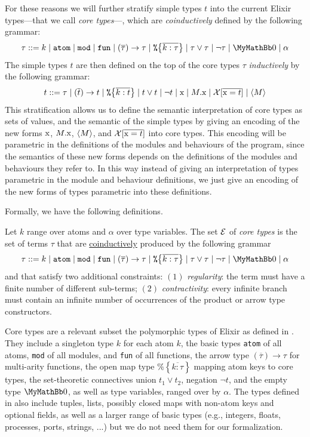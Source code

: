 \documentclass[a4paper,10pt]{article}
\begin{document}
For these reasons we will further stratify simple types $t$ into the current Elixir types---that we call \emph{core types}---, which are \emph{coinductively} defined by the following grammar:
$$\tau ::= k\mid\texttt{atom} \mid \texttt{mod} \mid \texttt{fun} \mid (\overline{\tau})\to\tau \mid \texttt{\%}\!\left\{\overline{k:\tau}\right\} \mid
    \tau \lor \tau \mid \lnot \tau \mid \Empty\mid \alpha
  $$
The simple types $t$ are then defined on the top of the core types $\tau$ \emph{inductively} by the following grammar:
$$t ::= \tau \mid  (\overline{t})\to t \mid \texttt{\%}\!\left\{\overline{k:t}\right\} \mid
    t \lor t \mid \lnot t \mid \text{\rm x}\mid M.\text{\rm x} \mid \mathcal{X}[\overline{\text{\rm x}=t}] \mid \langle M\rangle
  $$
This stratification allows us to define the semantic interpretation of core types as sets of values, and the semantic of the simple types by giving an encoding of the new forms $\text{\rm x}$, $M.\text{\rm x}$, $\langle M\rangle$, and $\mathcal{X}[\overline{\text{\rm x}=t}]$ into core types. This encoding will be parametric in the definitions of the modules and behaviours of the program, since the semantics of these new forms depends on the definitions of the modules and behaviours they refer to. In this way instead of giving an interpretation of types parametric in the module and behaviour definitions, we just give an encoding of the new forms of types parametric into these definitions.

Formally, we have the following definitions.

\begin{definition}\label{def:coretypes}
  Let $k$ range over atoms and $\alpha$ over type variables.
  The set $ \mathcal{E} $ of \emph{core types} is the set of terms $ \tau $
  that are \underline{coinductively} produced by the following grammar
  \[
    \tau ::= k\mid \texttt{atom} \mid \texttt{mod} \mid \texttt{fun} \mid (\overline{\tau}) \to \tau \mid  \texttt{\%}\!\left\{\overline{k:\tau}\right\} \mid
    \tau \lor \tau \mid \lnot \tau \mid \Empty\mid \alpha
  \]
  and that satisfy two additional constraints: $(1)$ \emph{regularity}:
          the term must have a finite number of different sub-terms; $(2)$ \emph{contractivity}:
          every infinite branch must contain an infinite number
          of occurrences of the product or arrow type constructors.
\end{definition}
Core types are a relevant subset the polymorphic types of Elixir as defined in \cite{CDV24,CD25}. They include a singleton type $k$ for each atom $k$, the basic types \texttt{atom} of all atoms, \texttt{mod} of all modules, and \texttt{fun} of all functions, the arrow type $(\overline{\tau}) \to \tau$ for multi-arity functions, the open map type $\texttt{\%}\!\left\{\overline{k:\tau}\right\}$ mapping atom keys to core types, the set-theoretic connectives union $t_1 \lor t_2$, negation $\lnot t$, and the empty type $\Empty$, as well as type variables, ranged over by $\alpha$. The types defined in \cite{CDV24,CD25} also include tuples, lists, possibly closed maps with non-atom keys and optional fields, as well as a larger range of basic types (e.g., integers, floats, processes, ports, strings, ...)  but we do not need them for our formalization.
\end{document}
